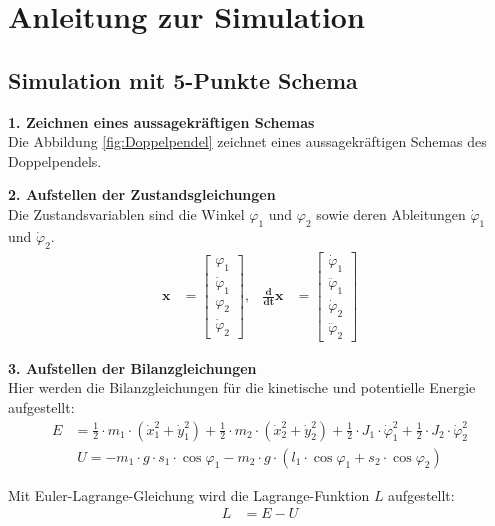 \chapter{Anleitung zur Simulation}\label{ch:Anleitung}  
\section{Simulation mit 5-Punkte Schema}
\textbf{1. Zeichnen eines aussagekräftigen Schemas}\\ 
Die Abbildung \ref{fig:Doppelpendel} zeichnet eines aussagekräftigen Schemas des Doppelpendels. 

\textbf{2. Aufstellen der Zustandsgleichungen}\\ 
Die Zustandsvariablen sind die Winkel $\varphi_1$ und $\varphi_2$ sowie deren Ableitungen $\dot{\varphi}_1$ und $\dot{\varphi}_2$. 
\begin{align}
\mathbf{x} &= \begin{bmatrix} 
\varphi_1 \\ 
\dot{\varphi}_1 \\ 
\varphi_2 \\ 
\dot{\varphi}_2 
\end{bmatrix}, &
\frac{\mathbf{d}}{\mathbf{dt}} \mathbf{x} &= \begin{bmatrix} 
\dot{\varphi}_1 \\ 
\ddot{\varphi}_1 \\ 
\dot{\varphi}_2 \\ 
\ddot{\varphi}_2 
\end{bmatrix}
\end{align}

\textbf{3. Aufstellen der Bilanzgleichungen}\\ 
Hier werden die Bilanzgleichungen für die kinetische und potentielle Energie aufgestellt:\\
\begin{align}
E &= \frac{1}{2} \cdot m_1 \cdot \left( \dot{x}_1^2 + \dot{y}_1^2 \right) + \frac{1}{2} \cdot m_2 \cdot \left( \dot{x}_2^2 + \dot{y}_2^2 \right) + \frac{1}{2} \cdot J_1 \cdot \dot{\varphi}_1^2 + \frac{1}{2} \cdot J_2 \cdot \dot{\varphi}_2^2
\end{align}
\begin{align}
U = -m_1  \cdot g \cdot s_1 \cdot \cos\varphi_1 - m_2 \cdot g \cdot (l_1 \cdot \cos\varphi_1 + s_2 \cdot \cos\varphi_2)
\end{align}

Mit Euler-Lagrange-Gleichung wird die Lagrange-Funktion $L$ aufgestellt:
\begin{align}
L &= E - U
\end{align}

